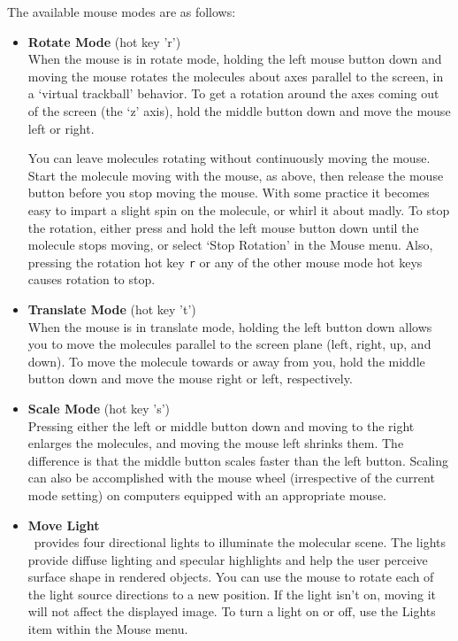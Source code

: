 The available mouse modes are as follows:
\begin{itemize}

\item {\bf Rotate Mode}
\hspace{0.2in} (hot key 'r')
\\
\label{ug:ui:disp:rotate}
When the mouse is in rotate mode, holding the left mouse button down 
and moving the mouse rotates the molecules about axes parallel to the
screen, in a `virtual trackball' behavior.  To get a rotation around
the axes coming out of the screen (the `z' axis), hold the middle
button down and move the mouse left or right.

You can leave molecules rotating
without continuously moving the mouse.  Start the molecule moving with
the mouse, as above, then release the mouse button before you stop
moving the mouse.  With some practice it becomes easy to impart a
slight spin on the molecule, or whirl it about madly.  To stop the
rotation, either press and hold the left mouse button down until the
molecule stops moving, or select `Stop Rotation' in the Mouse menu.
Also, pressing the rotation hot key {\tt r} or any of the other mouse 
mode hot keys causes rotation to stop.

\item {\bf Translate Mode} 
\hspace{0.2in} (hot key 't')
\\
\label{ug:ui:disp:trans}
When the mouse is in translate mode, holding the left button
down allows you to move the molecules parallel to the screen plane 
(left, right, up, and down).  To move
the molecule towards or away from you, hold the middle button down and
move the mouse right or left, respectively.

\item {\bf Scale Mode} 
\hspace{0.2in} (hot key 's')
\\
\label{ug:ui:disp:scale}
Pressing either the left or middle button down and moving to the right 
enlarges the molecules, and moving the mouse left shrinks them.  
The difference is that the middle button scales faster than the left button.
Scaling can also be accomplished with the mouse wheel (irrespective
of the current mode setting) on computers equipped with an appropriate
mouse.

\item {\bf Move Light} 
\\
\label{ug:ui:disp:lights}
\VMD\ provides four directional lights to illuminate the molecular scene.  
The lights provide diffuse lighting and specular highlights 
and help the user perceive surface shape in rendered objects.
You can use the mouse to rotate each of the light source directions
to a new position.
If the light isn't on, moving it will not affect the displayed image.
To turn a light on or off, use the {\sf Lights} item within the 
{\sf Mouse} menu.


\end{itemize}
